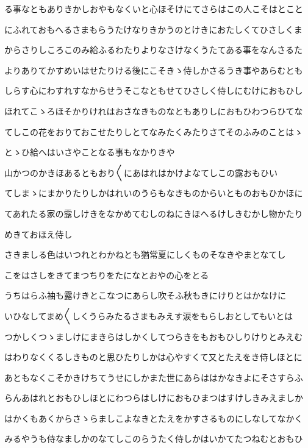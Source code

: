 \documentclass[a4paper,11pt,landscape]{ltjtarticle}
\begin{document}
る事なともありきかしおやもなくいと心ほそけにてさらはこの人こそはとこと
\par\medskip
にふれておもへるさまもらうたけなりきかうのとけきにおたしくてひさしくま
\par\medskip
からさりしころこのみ給ふるわたりよりなさけなくうたてある事をなんさるた
\par\medskip
よりありてかすめいはせたりける後にこそきゝ侍しかさるうき事やあらむとも
\par\medskip
しらす心にわすれすなからせうそこなともせてひさしく侍しにむけにおもひし
\par\medskip
ほれてこゝろほそかりけれはおさなきものなともありしにおもひわつらひてな
\par\medskip
てしこの花をおりておこせたりしとてなみたくみたりさてそのふみのことはゝ
\par\medskip
とゝひ給へはいさやことなる事もなかりきや
\par\medskip
山かつのかきほあるともおり〱にあはれはかけよなてしこの露おもひい
\par\medskip
てしまゝにまかりたりしかはれいのうらもなきものからいとものおもひかほに
\par\medskip
てあれたる家の露しけきをなかめてむしのねにきほへるけしきむかし物かたり
\par\medskip
めきておほえ侍し
\par\medskip
さきましる色はいつれとわかねとも猶常夏にしくものそなきやまとなてし
\par\medskip
こをはさしをきてまつちりをたになとおやの心をとる
\par\medskip
うちはらふ袖も露けきとこなつにあらし吹そふ秋もきにけりとはかなけに
\par\medskip
いひなしてまめ〱しくうらみたるさまもみえす涙をもらしおとしてもいとは
\par\medskip
つかしくつゝましけにまきらはしかくしてつらきをもおもひしりけりとみえむ
\par\medskip
はわりなくくるしきものと思ひたりしかは心やすくて又とたえをき侍しほとに
\par\medskip
あともなくこそかきけちてうせにしかまた世にあらははかなきよにそさすらふ
\par\medskip
らんあはれとおもひしほとにわつらはしけにおもひまつはすけしきみえましか
\par\medskip
はかくもあくからさゝらましこよなきとたえをかすさるものにしなしてなかく
\par\medskip
みるやうも侍なましかのなてしこのらうたく侍しかはいかてたつねむとおもひ
\par\medskip
\end{document}
